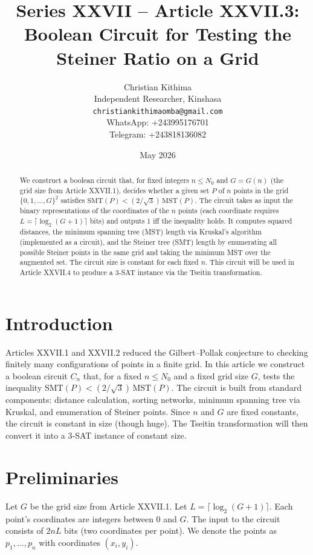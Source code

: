 \documentclass[11pt,a4paper]{article}
\title{Series XXVII – Article XXVII.3: Boolean Circuit for Testing the Steiner Ratio on a Grid}
\author{Christian Kithima \\
Independent Researcher, Kinshasa \\
\texttt{christiankithimaomba@gmail.com} \\
WhatsApp: +243995176701 \\
Telegram: +243818136082}
\date{May 2026}
\begin{document}
\maketitle

\begin{abstract}
We construct a boolean circuit that, for fixed integers \(n \le N_0\) and \(G = G(n)\) (the grid size from Article XXVII.1), decides whether a given set \(P\) of \(n\) points in the grid \(\{0,1,\dots,G\}^2\) satisfies \(\text{SMT}(P) < (2/\sqrt{3})\,\text{MST}(P)\). The circuit takes as input the binary representations of the coordinates of the \(n\) points (each coordinate requires \(L = \lceil \log_2(G+1)\rceil\) bits) and outputs 1 iff the inequality holds. It computes squared distances, the minimum spanning tree (MST) length via Kruskal's algorithm (implemented as a circuit), and the Steiner tree (SMT) length by enumerating all possible Steiner points in the same grid and taking the minimum MST over the augmented set. The circuit size is constant for each fixed \(n\). This circuit will be used in Article XXVII.4 to produce a 3‑SAT instance via the Tseitin transformation.
\end{abstract}

\tableofcontents

\section{Introduction}
Articles XXVII.1 and XXVII.2 reduced the Gilbert–Pollak conjecture to checking finitely many configurations of points in a finite grid. In this article we construct a boolean circuit \(C_n\) that, for a fixed \(n \le N_0\) and a fixed grid size \(G\), tests the inequality \(\text{SMT}(P) < (2/\sqrt{3})\,\text{MST}(P)\). The circuit is built from standard components: distance calculation, sorting networks, minimum spanning tree via Kruskal, and enumeration of Steiner points. Since \(n\) and \(G\) are fixed constants, the circuit is constant in size (though huge). The Tseitin transformation will then convert it into a 3‑SAT instance of constant size.

\section{Preliminaries}
Let \(G\) be the grid size from Article XXVII.1. Let \(L = \lceil \log_2(G+1)\rceil\). Each point's coordinates are integers between 0 and \(G\). The input to the circuit consists of \(2nL\) bits (two coordinates per point). We denote the points as \(p_1,\dots,p_n\) with coordinates \((x_i,y_i)\).
\end{document}
